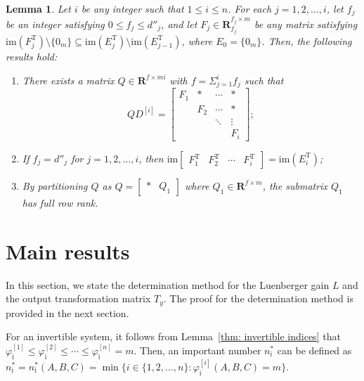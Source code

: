 \documentclass[sort&compress]{elsarticle}
\newtheorem{lemma}{Lemma}
\newcommand\faii{\varphi_\mathrm i}
\newcommand\nsharp{n_\mathrm i^*}
\newcommand\im{\mathrm{im}}
\newcommand\R{\mathbf R}
\newcommand\T{\mathrm T}
\begin{document}
\begin{lemma}\label{thm: QD=F}
Let $i$ be any integer such that $1 \le i \le n$.
For each $j=1,2,\dots,i$,
let $f_j$ be an integer satisfying $0 \le f_j \le d''_j$,
and let $F_j \in \R^{f_j \times m}_{f_j}$ be any matrix
satisfying $\im(F_j^\T) \setminus \{0_m\} \subseteq \im(E_j^\T) \setminus \im(E_{j-1}^\T)$,
where $E_0 = \{0_m\}$.
Then, the following results hold:
\begin{enumerate}
\item\label{thm:existQ}
There exists a matrix $Q \in \R^{f \times mi}$ with $f = \Sigma_{j=1}^i f_j$
such that
\[
QD^{[i]}=\begin{bmatrix}
F_1&*&\cdots&*\\
&F_2&\cdots&*\\
&&\ddots&\vdots\\
&&&F_i
\end{bmatrix};
\]
\item\label{thm:imF=imE}
If $f_j = d''_j$ for $j=1,2,\dots,i$, then
$\im\begin{bmatrix}F_1^\T & F_2^\T & \cdots & F_i^\T\end{bmatrix}
= \im(E_i^\T)$;
\item\label{thm:Q1rank}
By partitioning $Q$ as $Q = \begin{bmatrix} * & Q_1 \end{bmatrix}$
where $Q_1 \in \R^{f \times m}$,
the submatrix $Q_1$ has full row rank.
\end{enumerate}
\end{lemma}

\section{Main results}

In this section, we state the determination method for
the Luenberger gain $L$ and the output transformation matrix $T_y$.
The proof for the determination method is provided in the next section.

For an invertible system, it follows from
Lemma~\ref{thm: invertible indices} that
$\faii^{[1]}\le\faii^{[2]}\le\cdots\le\faii^{[n]}=m$.
Then, an important number $\nsharp$ can be defined as
$\nsharp=\nsharp(A,B,C)=\min\big\{i\in\{1,2,\dots,n\}:\faii^{[i]}(A,B,C)=m\big\}$.
\end{document}
